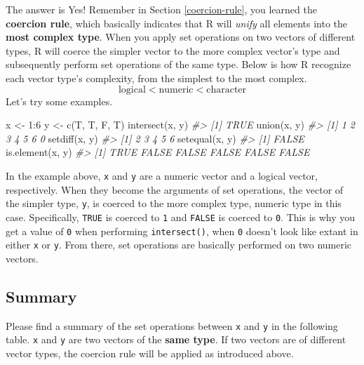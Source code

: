 \documentclass[
]{book}
\newenvironment{Shaded}{\begin{snugshade}}{\end{snugshade}}
\newcommand{\CommentTok}[1]{\textcolor[rgb]{0.56,0.35,0.01}{\textit{#1}}}
\newcommand{\DecValTok}[1]{\textcolor[rgb]{0.00,0.00,0.81}{#1}}
\newcommand{\FunctionTok}[1]{\textcolor[rgb]{0.00,0.00,0.00}{#1}}
\newcommand{\NormalTok}[1]{#1}
\newcommand{\OtherTok}[1]{\textcolor[rgb]{0.56,0.35,0.01}{#1}}
\newcommand{\SpecialCharTok}[1]{\textcolor[rgb]{0.00,0.00,0.00}{#1}}
\begin{document}
The answer is Yes! Remember in Section \ref{coercion-rule}, you learned the \textbf{coercion rule}, which basically indicates that R will \emph{unify} all elements into the \textbf{most complex type}. When you apply set operations on two vectors of different types, R will coerce the simpler vector to the more complex vector's type and subsequently perform set operations of the same type. Below is how R recognize each vector type's complexity, from the simplest to the most complex.
\[\mbox{logical} < \mbox{numeric} < \mbox{character}\]
Let's try some examples.

\begin{Shaded}
\begin{Highlighting}[]
\NormalTok{x }\OtherTok{\textless{}{-}} \DecValTok{1}\SpecialCharTok{:}\DecValTok{6}
\NormalTok{y }\OtherTok{\textless{}{-}} \FunctionTok{c}\NormalTok{(T, T, F, T)}
\FunctionTok{intersect}\NormalTok{(x, y)}
\CommentTok{\#\textgreater{} [1] TRUE}
\FunctionTok{union}\NormalTok{(x, y)}
\CommentTok{\#\textgreater{} [1] 1 2 3 4 5 6 0}
\FunctionTok{setdiff}\NormalTok{(x, y)}
\CommentTok{\#\textgreater{} [1] 2 3 4 5 6}
\FunctionTok{setequal}\NormalTok{(x, y)}
\CommentTok{\#\textgreater{} [1] FALSE}
\FunctionTok{is.element}\NormalTok{(x, y)}
\CommentTok{\#\textgreater{} [1]  TRUE FALSE FALSE FALSE FALSE FALSE}
\end{Highlighting}
\end{Shaded}

In the example above, \texttt{x} and \texttt{y} are a numeric vector and a logical vector, respectively. When they become the arguments of set operations, the vector of the simpler type, \texttt{y}, is coerced to the more complex type, numeric type in this case. Specifically, \texttt{TRUE} is coerced to \texttt{1} and \texttt{FALSE} is coerced to \texttt{0}. This is why you get a value of \texttt{0} when performing \texttt{intersect()}, when \texttt{0} doesn't look like extant in either \texttt{x} or \texttt{y}. From there, set operations are basically performed on two numeric vectors.

\hypertarget{summary}{%
\subsection{Summary}\label{summary}}

Please find a summary of the set operations between \texttt{x} and \texttt{y} in the following table. \texttt{x} and \texttt{y} are two vectors of the \textbf{same type}. If two vectors are of different vector types, the coercion rule will be applied as introduced above.
\end{document}

